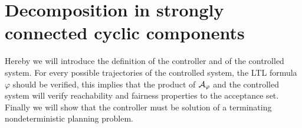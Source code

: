 \section{Decomposition in strongly connected cyclic components}
\newcommand{\planningdomain}{\ensuremath{ \tuple{\langle S, S_0, \mathcal{A}, \gamma \rangle} }}%
%
\newcommand{\controller}{\ensuremath{\systuple{ C, \{c_0\}, \Gamma, \Lambda, \systransition{\Fsc}{}, \Omega }}}%
%
\newcommand{\planningproblem}{\ensuremath{\tuple{ \langle \mathcal{D}, G \rangle}}}%
\newcommand{\Fsc}{\Pi}%
\newcommand{\Ftcs}{\Fts_\Fsc}%
\newcommand{\Asol}{\mathcal{A}_s'}%
\newcommand{\Aterm}{\mathcal{A}_s}%
%
Hereby we will introduce the definition of the controller and of the controlled system.
For every possible trajectories of the controlled system, the LTL formula $\varphi$ should be verified, this implies that the product of $\mathcal{A}_\varphi$ and the controlled system will verify reachability and fairness properties to the acceptance set.
Finally we will show that the controller must be solution of a terminating nondeterministic planning problem.

